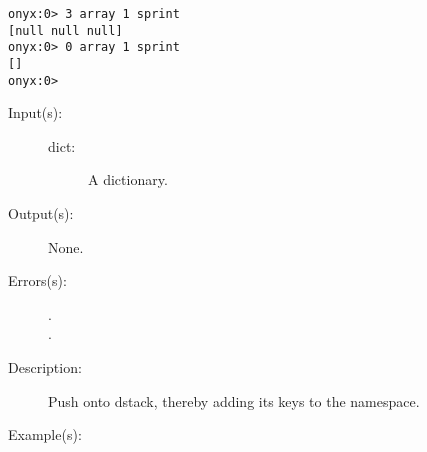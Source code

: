 \begin{description}
\begin{description}
\begin{verbatim}
onyx:0> 3 array 1 sprint
[null null null]
onyx:0> 0 array 1 sprint
[]
onyx:0>
		\end{verbatim}
	\end{description}
\label{systemdict:begin}
\item[{\onyxop{dict}{begin}{--}}: ]
	\begin{description}\item[]
	\item[Input(s): ]
		\begin{description}\item[]
		\item[dict: ]
			A dictionary.
		\end{description}
	\item[Output(s): ] None.
	\item[Errors(s): ]
		\begin{description}\item[]
		\item[.]
		\item[.]
		\end{description}
	\item[Description: ]
		Push  onto dstack, thereby adding its keys to the
		namespace.
	\item[Example(s): ]\begin{verbatim}


\end{verbatim}
\end{description}
\end{description}
